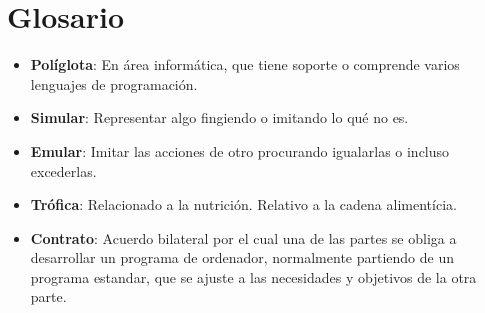 \newpage
\section*{Glosario}
\begin{itemize}  
  \item \textbf{Políglota}: En área informática, que tiene soporte o comprende varios lenguajes de programación.  
  \item \textbf{Simular}: Representar algo fingiendo o imitando lo qué no es.
  \item \textbf{Emular}: Imitar las acciones de otro procurando igualarlas o incluso excederlas.
  \item \textbf{Trófica}: Relacionado a la nutrición. Relativo a la cadena alimentícia.
  \item \textbf{Contrato}: Acuerdo bilateral por el cual una de las partes se obliga a desarrollar un programa de ordenador, normalmente partiendo de un programa estandar, que se ajuste a las necesidades y objetivos de la otra parte.
\end{itemize}
